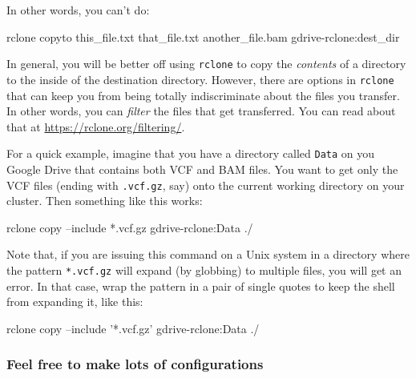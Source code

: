 \documentclass[]{krantz}
\makeatletter
\newenvironment{Shaded}{\begin{snugshade}}{\end{snugshade}}
\newcommand{\ExtensionTok}[1]{#1}
\newcommand{\NormalTok}[1]{#1}
\newcommand{\StringTok}[1]{\textcolor[rgb]{0.5,0.5,0.5}{#1}}
\newenvironment{kframe}{%
\medskip{}
\setlength{\fboxsep}{.8em}
 \def\at@end@of@kframe{}%
 \ifinner\ifhmode%
  \def\at@end@of@kframe{\end{minipage}}%
  \begin{minipage}{\columnwidth}%
 \fi\fi%
 \def\FrameCommand##1{\hskip\@totalleftmargin \hskip-\fboxsep
 \colorbox{shadecolor}{##1}\hskip-\fboxsep
     \hskip-\linewidth \hskip-\@totalleftmargin \hskip\columnwidth}%
 \MakeFramed {\advance\hsize-\width
   \@totalleftmargin\z@ \linewidth\hsize
   \@setminipage}}%
 {\par\unskip\endMakeFramed%
 \at@end@of@kframe}
\renewenvironment{Shaded}{\begin{kframe}}{\end{kframe}}
\makeatother
\begin{document}
In other words, you can't do:

\begin{Shaded}
\begin{Highlighting}[]
\ExtensionTok{rclone}\NormalTok{ copyto this_file.txt that_file.txt another_file.bam gdrive-rclone:dest_dir}
\end{Highlighting}
\end{Shaded}

In general, you will be better off using \texttt{rclone} to copy the \emph{contents} of a directory
to the inside of the destination directory. However, there are options in \texttt{rclone} that
can keep you from being totally indiscriminate about the files you transfer. In other words,
you can \emph{filter} the files that get transferred. You can read about that at
\url{https://rclone.org/filtering/}.

For a quick example, imagine that you have a directory called \texttt{Data} on you Google Drive
that contains both VCF and BAM files. You want to get only the VCF files (ending with \texttt{.vcf.gz}, say)
onto the current working directory on your cluster. Then something like this works:

\begin{Shaded}
\begin{Highlighting}[]
\ExtensionTok{rclone}\NormalTok{ copy --include *.vcf.gz gdrive-rclone:Data ./}
\end{Highlighting}
\end{Shaded}

Note that, if you are issuing this command on a Unix system in a directory
where the pattern \texttt{*.vcf.gz} will expand (by globbing) to multiple files, you will
get an error. In that case, wrap the pattern in a pair of single quotes to keep
the shell from expanding it, like this:

\begin{Shaded}
\begin{Highlighting}[]
\ExtensionTok{rclone}\NormalTok{ copy --include }\StringTok{'*.vcf.gz'}\NormalTok{ gdrive-rclone:Data ./}
\end{Highlighting}
\end{Shaded}

\hypertarget{feel-free-to-make-lots-of-configurations}{%
\subsubsection{Feel free to make lots of configurations}\label{feel-free-to-make-lots-of-configurations}}
\end{document}
